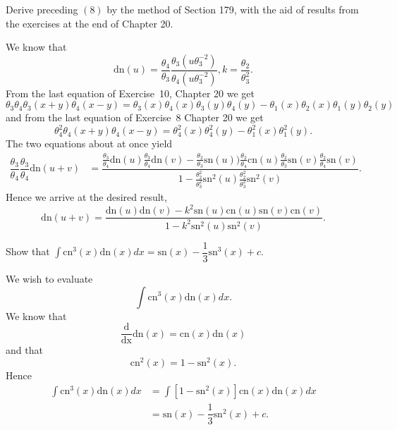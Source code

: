 \begin{problem}\label{problem2chapter21}
Derive preceding $(8)$ by the method of Section 179, with the aid of results from the exercises at the end of Chapter 20.
\end{problem}
\begin{solution}
We know that 
$$\mathrm{dn}(u) = \dfrac{\theta_4}{\theta_3} \dfrac{\theta_3(u\theta_3^{-2})}{\theta_4(u\theta_3^{-2})}, k = \dfrac{\theta_2}{\theta_3^2}.$$
From the last equation of Exercise~10, Chapter 20 we get
$$\theta_3 \theta_4 \theta_3(x+y) \theta_4(x-y) = \theta_3(x) \theta_4(x) \theta_3(y) \theta_4(y) - \theta_1(x) \theta_2(x) \theta_1(y) \theta_2(y)$$
and from the last equation of Exercise~8 Chapter 20 we get
$$\theta_4^2 \theta_4(x+y)\theta_4(x-y) = \theta_4^2(x) \theta_4^2(y) - \theta_1^2(x) \theta_1^2(y).$$
The two equations about at once yield
$$\begin{array}{ll}
\dfrac{\theta_3}{\theta_4} \dfrac{\theta_3}{\theta_4} \mathrm{dn}(u+v) &= \dfrac{\frac{\theta_3}{\theta_4} \mathrm{dn}(u) \frac{\theta_3}{\theta_4} \mathrm{dn}(v) - \frac{\theta_2}{\theta_3} \mathrm{\mathrm{sn}}(u)) \frac{\theta_2}{\theta_4} \mathrm{cn}(u) \frac{\theta_2}{\theta_3} \mathrm{\mathrm{sn}}(v) \frac{\theta_2}{\theta_4} \mathrm{\mathrm{sn}}(v)}{1 - \frac{\theta_2^2}{\theta_3^2} \mathrm{\mathrm{sn}}^2(u) \frac{\theta_2^2}{\theta_3^2} \mathrm{\mathrm{sn}}^2(v)}.
\end{array}$$
Hence we arrive at the desired result,
$$\mathrm{dn}(u+v) = \dfrac{\mathrm{dn}(u) \mathrm{dn}(v) - k^2 \mathrm{\mathrm{sn}}(u) \mathrm{cn}(u) \mathrm{\mathrm{sn}}(v) \mathrm{cn}(v)}{1 - k^2 \mathrm{\mathrm{sn}}^2(u) \mathrm{\mathrm{sn}}^2(v)}.$$
\end{solution}
\begin{problem}\label{problem3chapter21}
Show that $\displaystyle\int \mathrm{cn}^3(x) \mathrm{dn}(x) dx = \mathrm{\mathrm{sn}}(x) - \dfrac{1}{3} \mathrm{\mathrm{sn}}^3(x) + c.$
\end{problem}
\begin{solution}
We wish to evaluate 
$$\displaystyle\int \mathrm{cn}^3(x) \mathrm{dn}(x) dx.$$
We know that
$$\dfrac{\mathrm{d}}{\mathrm{dx}} \mathrm{dn}(x) = \mathrm{cn}(x) \mathrm{dn}(x)$$
and that
$$\mathrm{cn}^2(x) =1-\mathrm{\mathrm{sn}}^2(x).$$
Hence
$$\begin{array}{ll}
\displaystyle\int \mathrm{cn}^3(x) \mathrm{dn}(x) dx &= \displaystyle\int [1-\mathrm{\mathrm{sn}}^2(x)] \mathrm{cn}(x) \mathrm{dn}(x) dx \\
&= \mathrm{\mathrm{sn}}(x) - \dfrac{1}{3} \mathrm{\mathrm{sn}}^2(x) +c.
\end{array}$$
\end{solution}
